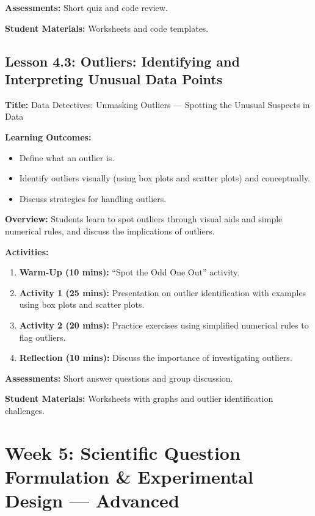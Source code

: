 \documentclass{tufte-book}
\begin{document}
\medskip
\textbf{Assessments:}  
Short quiz and code review.

\medskip
\textbf{Student Materials:}  
Worksheets and code templates.

\subsection{Lesson 4.3: Outliers: Identifying and Interpreting Unusual Data Points}
\textbf{Title:} Data Detectives: Unmasking Outliers --- Spotting the Unusual Suspects in Data

\medskip
\textbf{Learning Outcomes:}
\begin{itemize}[leftmargin=*, label={\textbullet}]
    \item Define what an outlier is.
    \item Identify outliers visually (using box plots and scatter plots) and conceptually.
    \item Discuss strategies for handling outliers.
\end{itemize}

\medskip
\textbf{Overview:}  
Students learn to spot outliers through visual aids and simple numerical rules, and discuss the implications of outliers.

\medskip
\textbf{Activities:}
\begin{enumerate}[label=\arabic*.]
    \item \textbf{Warm-Up (10 mins):} “Spot the Odd One Out” activity.
    \item \textbf{Activity 1 (25 mins):} Presentation on outlier identification with examples using box plots and scatter plots.
    \item \textbf{Activity 2 (20 mins):} Practice exercises using simplified numerical rules to flag outliers.
    \item \textbf{Reflection (10 mins):} Discuss the importance of investigating outliers.
\end{enumerate}

\medskip
\textbf{Assessments:}  
Short answer questions and group discussion.

\medskip
\textbf{Student Materials:}  
Worksheets with graphs and outlier identification challenges.

\section{Week 5: Scientific Question Formulation \& Experimental Design --- Advanced}
\end{document}
